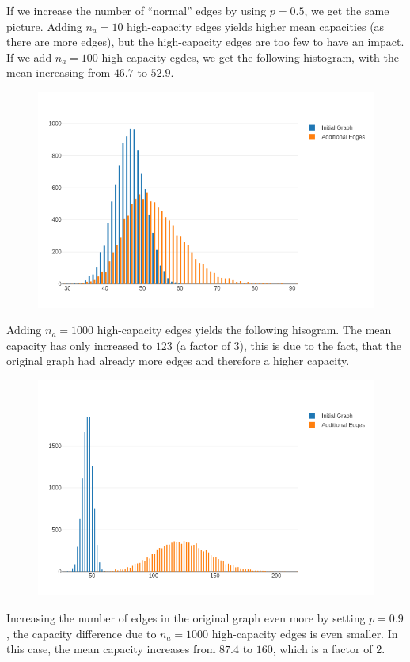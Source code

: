If we increase the number of ``normal'' edges by using $p=0.5$, we get the same picture. Adding $n_a=10$ high-capacity edges yields higher mean capacities (as there are more edges), but the high-capacity edges are too few to have an impact. If we add $n_a=100$ high-capacity egdes, we get the following histogram, with the mean increasing from $46.7$ to $52.9$.

\begin{figure}[H]
\centering
\includegraphics[scale=0.55]{images/max_flow_05_04.png}
\end{figure}

Adding $n_a=1000$ high-capacity edges yields the following hisogram. The mean capacity has only increased to $123$ (a factor of $3$), this is due to the fact, that the original graph had already more edges and therefore a higher capacity.

\begin{figure}[H]
\centering
\includegraphics[scale=0.55]{images/max_flow_05_05.png}
\end{figure}

Increasing the number of edges in the original graph even more by setting $p=0.9$, the capacity difference due to $n_a=1000$ high-capacity edges is even smaller. In this case, the mean capacity increases from $87.4$ to $160$, which is a factor of $2$.

